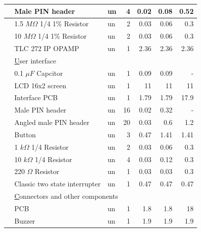 \documentclass[12pt,letterpaper]{article}
\numberwithin{figure}{section}
\numberwithin{equation}{section}
\numberwithin{table}{section}
\begin{document}
\begin{appendices}
\begin{table}[]
{\begin{tabular}{|l|l|l|r|r|r|r|}
            & Male PIN header                          & un    & 4      & 0.02     & 0.08    & 0.52    \\ \hline
            & 1.5 $M\Omega$ 1/4 1\% Resistor                & un    & 2      & 0.03     & 0.06    & 0.3     \\ \hline
            & 10 $M\Omega$ 1/4 1\% Resistor                 & un    & 2      & 0.03     & 0.06    & 0.3     \\ \hline
            & TLC 272 IP OPAMP                         & un    & 1      & 2.36     & 2.36    & 2.36    \\ \hline
            & \multicolumn{6}{l|}{{\ul User interface}} \\ 
\hline
            & 0.1 $\mu F$ Capcitor                        & un    & 1      & 0.09     & 0.09    & -       \\ \hline
            & LCD 16x2 screen                          & un    & 1      & 11       & 11      & 11      \\ \hline
            & Interface PCB                            & un    & 1      & 1.79     & 1.79    & 17.9    \\ \hline
            & Male PIN header                          & un    & 16     & 0.02     & 0.32    & -       \\ \hline
            & Angled male PIN header                   & un    & 20     & 0.03     & 0.6     & 1.2     \\ \hline
            & Button                                   & un    & 3      & 0.47     & 1.41    & 1.41    \\ \hline
            & 1 $k\Omega$  1/4 Resistor                      & un    & 2      & 0.03     & 0.06    & 0.3     \\ \hline
            & 10 $k\Omega$ 1/4 Resistor                     & un    & 4      & 0.03     & 0.12    & 0.3     \\ \hline
            & 220 $\Omega$ Resistor                         & un    & 1      & 0.03     & 0.03    & 0.3     \\ \hline
            & Classic two state interrupter            & un    & 1      & 0.47     & 0.47    & 0.47    \\ \hline
            & \multicolumn{6}{l|}{{\ul Connectors and other components}} \\ 
\hline
            & PCB                                     & un     & 1      & 1.8      & 1.8     & 18      \\ \hline
            & Buzzer                                  & un     & 1      & 1.9      & 1.9     & 1.9     \\ \hline

\end{tabular}}
\end{table}
\end{appendices}
\end{document}
